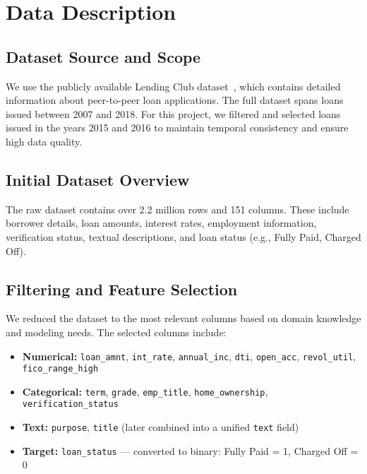 \section{Data Description}

\subsection{Dataset Source and Scope}

We use the publicly available Lending Club dataset~\cite{lendingclub}, which contains detailed information about peer-to-peer loan applications. The full dataset spans loans issued between 2007 and 2018. For this project, we filtered and selected loans issued in the years 2015 and 2016 to maintain temporal consistency and ensure high data quality.

\subsection{Initial Dataset Overview}

The raw dataset contains over 2.2 million rows and 151 columns. These include borrower details, loan amounts, interest rates, employment information, verification status, textual descriptions, and loan status (e.g., Fully Paid, Charged Off).

\subsection{Filtering and Feature Selection}

We reduced the dataset to the most relevant columns based on domain knowledge and modeling needs. The selected columns include:

\begin{itemize}
    \item \textbf{Numerical:} \texttt{loan\_amnt}, \texttt{int\_rate}, \texttt{annual\_inc}, \texttt{dti}, \texttt{open\_acc}, \texttt{revol\_util}, \texttt{fico\_range\_high}
    \item \textbf{Categorical:} \texttt{term}, \texttt{grade}, \texttt{emp\_title}, \texttt{home\_ownership}, \texttt{verification\_status}
    \item \textbf{Text:} \texttt{purpose}, \texttt{title} (later combined into a unified \texttt{text} field)
    \item \textbf{Target:} \texttt{loan\_status} — converted to binary: Fully Paid = 1, Charged Off = 0
\end{itemize}

